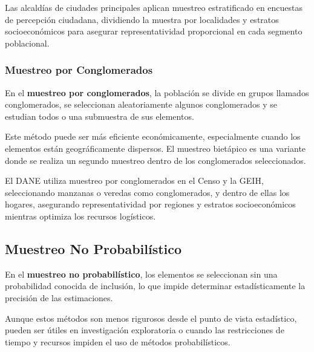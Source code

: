 \begin{example}
Las alcaldías de ciudades principales aplican muestreo estratificado en encuestas de percepción ciudadana, dividiendo la muestra por localidades y estratos socioeconómicos para asegurar representatividad proporcional en cada segmento poblacional.
\end{example}

\subsubsection{Muestreo por Conglomerados}

\begin{definition}
En el \textbf{muestreo por conglomerados}, la población se divide en grupos llamados conglomerados, se seleccionan aleatoriamente algunos conglomerados y se estudian todos o una submuestra de sus elementos.
\end{definition}

\begin{remark}
Este método puede ser más eficiente económicamente, especialmente cuando los elementos están geográficamente dispersos. El muestreo bietápico es una variante donde se realiza un segundo muestreo dentro de los conglomerados seleccionados.
\end{remark}

\begin{example}
El DANE utiliza muestreo por conglomerados en el Censo y la GEIH, seleccionando manzanas o veredas como conglomerados, y dentro de ellas los hogares, asegurando representatividad por regiones y estratos socioeconómicos mientras optimiza los recursos logísticos.
\end{example}

\subsection{Muestreo No Probabilístico}

\begin{definition}
En el \textbf{muestreo no probabilístico}, los elementos se seleccionan sin una probabilidad conocida de inclusión, lo que impide determinar estadísticamente la precisión de las estimaciones.
\end{definition}

\begin{remark}
Aunque estos métodos son menos rigurosos desde el punto de vista estadístico, pueden ser útiles en investigación exploratoria o cuando las restricciones de tiempo y recursos impiden el uso de métodos probabilísticos.
\end{remark}

